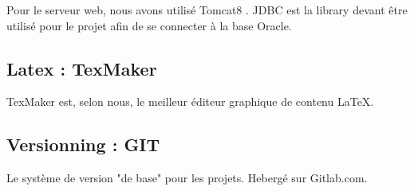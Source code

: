\documentclass[a4paper,oneside,10pt]{article}
\begin{document}
Pour le serveur web, nous avons utilisé Tomcat8 . 
JDBC est la library devant être utilisé pour le projet afin de se connecter à la base Oracle.  

\subsection{Latex : TexMaker}

TexMaker est, selon nous, le meilleur éditeur graphique de contenu \LaTeX. 

\subsection{Versionning : GIT}

Le système de version "de base" pour les projets. Hebergé sur Gitlab.com. 
\end{document}
